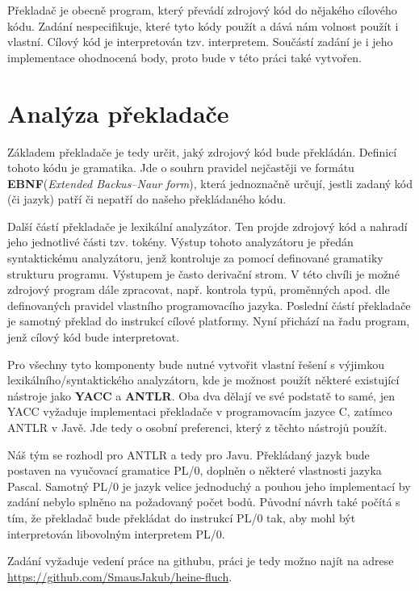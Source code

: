 \documentclass[
12pt,
a4paper,
pdftex,
czech,
titlepage
]{report}
\begin{document}
Překladač je obecně program, který převádí zdrojový kód do nějakého cílového kódu. Zadání nespecifikuje, které tyto kódy použít a dává nám volnost použít i vlastní. Cílový kód je interpretován tzv. interpretem. Součástí zadání je i jeho implementace ohodnocená body, proto bude v této práci také vytvořen.

\section{Analýza překladače}

Základem překladače je tedy určit, jaký zdrojový kód bude překládán. Definicí tohoto kódu je gramatika. Jde o souhrn pravidel nejčastěji ve formátu \textbf{EBNF}(\textit{Extended Backus–Naur form}), která jednoznačně určují, jestli zadaný kód (či jazyk) patří či nepatří do našeho překládaného kódu. 

Další částí překladače je lexikální analyzátor. Ten projde zdrojový kód a nahradí jeho jednotlivé části tzv. tokény. Výstup tohoto analyzátoru je předán syntaktickému analyzátoru, jenž kontroluje za pomocí definované gramatiky strukturu programu. Výstupem je často derivační strom. V této chvíli je možné zdrojový program dále zpracovat, např. kontrola typů, proměnných apod. dle definovaných pravidel vlastního programovacího jazyka. Poslední částí překladače je samotný překlad do instrukcí cílové platformy. Nyní přichází na řadu program, jenž cílový kód bude interpretovat.

Pro všechny tyto komponenty bude nutné vytvořit vlastní řešení s výjimkou lexikálního/syntaktického analyzátoru, kde je možnost použít některé existující nástroje jako \textbf{YACC} a \textbf{ANTLR}. Oba dva dělají ve své podstatě to samé, jen YACC vyžaduje implementaci překladače v programovacím jazyce C, zatímco ANTLR v Javě. Jde tedy o osobní preferenci, který z těchto nástrojů použít.

Náš tým se rozhodl pro ANTLR a tedy pro Javu. Překládaný jazyk bude postaven na vyučovací gramatice PL/0, doplněn o některé vlastnosti jazyka Pascal. Samotný PL/0 je jazyk velice jednoduchý a pouhou jeho implementací by zadání nebylo splněno na požadovaný počet bodů. Původní návrh také počítá s tím, že překladač bude překládat do instrukcí PL/0 tak, aby mohl být interpretován libovolným interpretem PL/0. 

Zadání vyžaduje vedení práce na githubu, práci je tedy možno najít na adrese \href{https://github.com/SmausJakub/heine-fluch}{https://github.com/SmausJakub/heine-fluch}.
\end{document}
